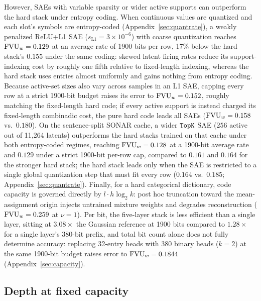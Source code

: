 However, SAEs with variable sparsity or wider active supports can outperform
the hard stack under entropy coding. When continuous values are quantized
and each slot's symbols are entropy-coded (Appendix~\ref{sec:quantrate}), a
weakly penalized ReLU+L1 SAE ($s_{\mathrm{L1}}{=}3\times10^{-6}$) with
coarse quantization reaches $\mathrm{FVU}_w = 0.129$ at an average rate of 1900 bits
per row, 17\% below the hard stack's $0.155$ under the same coding: skewed
latent firing rates reduce its
support-indexing cost by roughly one fifth relative to fixed-length
indexing, whereas the hard stack uses entries almost uniformly and gains
nothing from entropy coding. Because active-set sizes also vary across
samples in an L1 SAE, capping every row at a strict 1900-bit budget raises
its error to $\mathrm{FVU}_w = 0.152$, roughly matching the fixed-length hard code;
if every active support is instead charged its fixed-length combinadic cost,
the pure hard code leads all SAEs ($\mathrm{FVU}_w = 0.158$ vs.\ $0.180$). On the
sentence-split SONAR cache, a wider $\mathop{\mathtt{TopK}}\limits$ SAE ($256$ active out of
11{,}264 latents) outperforms the hard stacks trained on that cache under
both entropy-coded regimes, reaching $\mathrm{FVU}_w = 0.128$ at a 1900-bit average
rate and $0.129$ under a strict 1900-bit per-row cap, compared to $0.161$
and $0.164$ for the stronger hard stack; the hard stack leads only when the
SAE is restricted to a single global quantization step that must fit every
row ($0.164$ vs.\ $0.185$; Appendix~\ref{sec:quantrate}). Finally, for a
hard categorical dictionary, code capacity is governed directly by
$l\cdot h\log_2 k$: post hoc truncation toward the mean-assignment origin
injects untrained mixture weights and degrades reconstruction
($\mathrm{FVU}_w = 0.259$ at $\nu{=}1$). Per bit, the five-layer stack is less
efficient than a single layer, sitting at $3.08\times$ the Gaussian
reference at 1900 bits compared to $1.28\times$ for a single layer's
380-bit prefix, and total bit count alone does not fully determine
accuracy: replacing 32-entry heads with 380 binary heads
($k{=}2$) at the same 1900-bit budget raises error to $\mathrm{FVU}_w = 0.1844$
(Appendix~\ref{sec:capacity}).

\subsection{Depth at fixed capacity}
\label{sec:depth}

